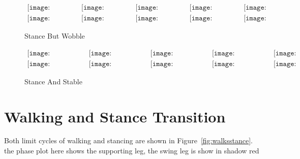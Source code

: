 \begin{figure}[!htbp]
  \begin{center}
  $
     \begin{array}{ccccc}
\texttt{[image: stancewobble/0001.eps]}&
\texttt{[image: stancewobble/0021.eps]}&
\texttt{[image: stancewobble/0041.eps]}&
\texttt{[image: stancewobble/0061.eps]}&
\texttt{[image: stancewobble/0081.eps]}
\\
\texttt{[image: stancewobble/0101.eps]}&
\texttt{[image: stancewobble/0121.eps]}&
\texttt{[image: stancewobble/0141.eps]}&
\texttt{[image: stancewobble/0161.eps]}&
\texttt{[image: stancewobble/0181.eps]}

\end{array}$
    \caption{Stance But Wobble}
    \label{fig:stancespeed}
\end{center}
\end{figure}



\begin{figure}[!htbp]
  \begin{center}
        $\begin{array}{ccccc}
\texttt{[image: stanceconverge/0001.eps]}&
\texttt{[image: stanceconverge/0021.eps]}&
\texttt{[image: stanceconverge/0041.eps]}&
\texttt{[image: stanceconverge/0061.eps]}&
\texttt{[image: stanceconverge/0081.eps]}
\\
\texttt{[image: stanceconverge/0101.eps]}&
\texttt{[image: stanceconverge/0121.eps]}&
\texttt{[image: stanceconverge/0141.eps]}&
\texttt{[image: stanceconverge/0161.eps]}&
\texttt{[image: stanceconverge/0181.eps]}

\end{array}$
    \caption{Stance And Stable}
    \label{fig:fastconverge}
\end{center}
\end{figure}




\section{Walking and Stance Transition}
Both limit cycles of walking and stancing are shown in Figure~\ref{fig:walksstance}.
the phase plot here shows the supporting leg, the swing leg is show in shadow red






